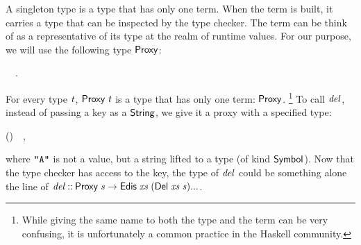 A singleton type is a type that has only one term. When the term is built, it
carries a type that can be inspected by the type checker. The term can be think
of as a representative of its type at the realm of runtime values. For our
purpose, we will use the following type \ensuremath{\Conid{Proxy}}:
\begin{hscode}\SaveRestoreHook
{}%
%
\>[B]{}\;\;\mathrel{=}~~.{}\<[E]%
\ColumnHook
\end{hscode}\resethooks
For every type \ensuremath{\Varid{t}}, \ensuremath{\Conid{Proxy}\;\Varid{t}} is a type that has only one term: \ensuremath{\Conid{Proxy}}.
\footnote{While giving the same name to both the type and the term can be very
confusing, it is unfortunately a common practice in the Haskell community.}
To call \ensuremath{\Varid{del}}, instead of passing a key as a \ensuremath{\Conid{String}}, we give it a proxy with
a specified type:
\begin{hscode}\SaveRestoreHook
{}%
%
\>[B]{}\;(\mathbin{::}\;)~~,{}\<[E]%
\ColumnHook
\end{hscode}\resethooks
where \ensuremath{\text{\tt \char34 A\char34}} is not a value, but a string lifted to a type (of kind \ensuremath{\Conid{Symbol}}).
Now that the type checker has access to the key, the type of \ensuremath{\Varid{del}} could be
something alone the line of \ensuremath{\Varid{del}\mathbin{::}\Conid{Proxy}\;\Varid{s}\to \Conid{Edis}\;\Varid{xs}\;(\Conid{Del}\;\Varid{xs}\;\Varid{s})\mathbin{...}}.

